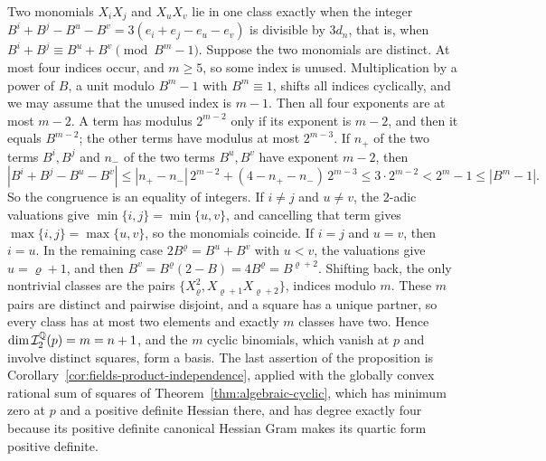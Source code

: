 Two monomials $X_iX_j$ and $X_uX_v$ lie in one class exactly when the integer
$B^i+B^j-B^u-B^v=3(e_i+e_j-e_u-e_v)$ is divisible by $3d_n$, that is, when
$B^i+B^j\equiv B^u+B^v\pmod{B^m-1}$. Suppose the two monomials are distinct.
At most four indices occur, and $m\ge5$, so some index is unused.
Multiplication by a power of $B$, a unit modulo $B^m-1$ with $B^m\equiv1$,
shifts all indices cyclically, and we may assume that the unused index is
$m-1$. Then all four exponents are at most $m-2$. A term has modulus $2^{m-2}$
only if its exponent is $m-2$, and then it equals $B^{m-2}$; the other terms
have modulus at most $2^{m-3}$. If $n_+$ of the two terms $B^i,B^j$ and
$n_-$ of the two terms $B^u,B^v$ have exponent $m-2$, then
\[
 |B^i+B^j-B^u-B^v|\le|n_+-n_-|\,2^{m-2}+(4-n_+-n_-)\,2^{m-3}
 \le3\cdot2^{m-2}<2^m-1\le|B^m-1| .
\]
So the congruence is an equality of integers. If $i\ne j$ and $u\ne v$, the $2$-adic valuations give
$\min\{i,j\}=\min\{u,v\}$, and cancelling that term gives
$\max\{i,j\}=\max\{u,v\}$, so the monomials coincide. If $i=j$ and $u=v$,
then $i=u$. In the remaining case $2B^\varrho=B^u+B^v$ with $u<v$, the
valuations give $u=\varrho+1$, and then $B^v=B^\varrho(2-B)=4B^\varrho=B^{\varrho+2}$.
Shifting back, the only nontrivial classes are the pairs
$\{X_\varrho^2,X_{\varrho+1}X_{\varrho+2}\}$, indices modulo $m$. These $m$
pairs are distinct and pairwise disjoint, and a square has a unique partner,
so every class has at most two elements and exactly $m$ classes have two.
Hence $\dim\mathcal I_2^\mathbb Q(p)=m=n+1$, and the $m$ cyclic binomials, which
vanish at $p$ and involve distinct squares, form a basis. The last assertion
of the proposition is
Corollary~\ref{cor:fields-product-independence}, applied with the globally
convex rational sum of squares of Theorem~\ref{thm:algebraic-cyclic}, which
has minimum zero at $p$ and a positive definite Hessian there, and has degree
exactly four because its positive definite canonical Hessian Gram makes its
quartic form positive definite.
